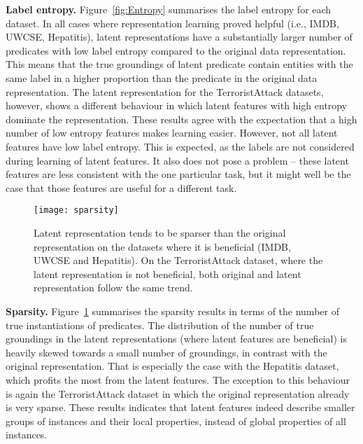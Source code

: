 \textbf{Label entropy.}
Figure~\ref{fig:Entropy} summarises the label entropy for each dataset.
In all cases where representation learning proved helpful (i.e., IMDB, UWCSE, Hepatitis), latent representations have a substantially larger number of predicates with low label entropy compared to the original data representation.
This means that the true groundings of latent predicate contain entities with the same label in a higher proportion than the predicate in the original data representation.
The latent representation for the TerroristAttack datasets, however, shows a different behaviour in which latent features with high entropy dominate the representation.
These results agree with the expectation that a high number of low entropy features makes learning easier.
However, not all latent features have low label entropy.
This is expected, as the labels are not considered during learning of latent features.
It also does not pose a problem -- these latent features are less consistent with the one particular task, but it might well be the case that those features are useful for a different task.




\begin{figure}
	\centering
	\medskip
    \texttt{[image: sparsity]}
    \caption[Sparsity of latent representation created by \gls{curled}]{Latent representation tends to be sparser than the original representation on the datasets where it is beneficial (IMDB, UWCSE and Hepatitis). On the TerroristAttack dataset, where the latent representation is not beneficial, both original and latent representation follow the same trend. }
    \label{fig:Sparsity}
\end{figure}


\textbf{Sparsity.}
Figure~\ref{fig:Sparsity} summarises the sparsity results in terms of the number of true instantiations of predicates.
The distribution of the number of true groundings in the latent representations (where latent features are beneficial) is heavily skewed towards a small number of groundings, in contrast with the original representation.
That is especially the case with the Hepatitis dataset, which profits the most from the latent features.
The exception to this behaviour is again the TerroristAttack dataset in which the original representation already is very sparse.
These results indicates that latent features indeed describe smaller groups of instances and their local properties, instead of global properties of all instances.





